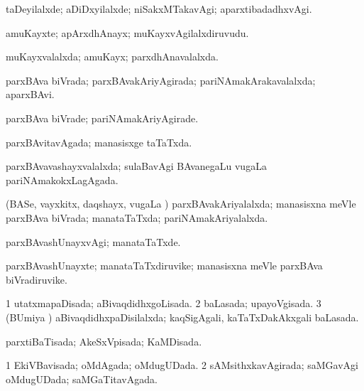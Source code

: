 \bentry
{} 
\gl{\kirxvi}
\expl{}
\bmng
taDeyilalxde; aDiDxyilalxde; niSakxMTakavAgi; aparxtibadadhxvAgi. 
\emng
\eentry

\bentry
{} 
\gl{\nA}
\expl{}
\bmng
amuKayxte; apArxdhAnayx; muKayxvAgilalxdiruvudu. 
\emng
\eentry

\bentry
{} 
\gl{\gu}
\expl{}
\bmng
muKayxvalalxda; amuKayx; parxdhAnavalalxda. 
\emng
\eentry

\bentry
{} 
\gl{\gu}
\expl{}
\bmng
parxBAva biVrada; parxBAvakAriyAgirada; pariNAmakArakavalalxda; aparxBAvi. 
\emng
\eentry

\bentry
{} 
\gl{\kirxvi}
\expl{}
\bmng
parxBAva biVrade; pariNAmakAriyAgirade. 
\emng
\eentry

\bentry
{} 
\gl{\gu}
\expl{}
\bmng
parxBAvitavAgada; manasisxge taTaTxda. 
\emng
\eentry

\bentry
{} 
\gl{\gu}
\expl{}
\bmng
parxBAvavashayxvalalxda; sulaBavAgi BAvanegaLu \mo vugaLa pariNAmakokxLagAgada. 
\emng
\eentry

\bentry
{} 
\gl{\gu}
\expl{}
\bmng
(BASe, vayxkitx, daqshayx, \mo vugaLa \vi) parxBAvakAriyalalxda; manasisxna meVle parxBAva biVrada; manataTaTxda; pariNAmakAriyalalxda. 
\emng
\eentry

\bentry
{} 
\gl{\kirxvi}
\expl{}
\bmng
parxBAvashUnayxvAgi; manataTaTxde. 
\emng
\eentry

\bentry
{} 
\gl{\nA}
\expl{}
\bmng
parxBAvashUnayxte; manataTaTxdiruvike; manasisxna meVle parxBAva biVradiruvike. 
\emng
\eentry

\bentry
{} 
\gl{\gu}
\expl{}
\bmng
\bnum
\num{1} utatxmapaDisada; aBivaqdidhxgoLisada. 
\num{2} baLasada; upayoVgisada. 
\num{3} (BUmiya \vi) aBivaqdidhxpaDisilalxda; kaqSigAgali, kaTaTxDakAkxgali baLasada. 
\enum
\emng
\eentry

\bentry
{} 
\gl{\gu}
\expl{}
\bmng
parxtiBaTisada; AkeSxVpisada; KaMDisada. 
\emng
\eentry

\bentry
{} 
\gl{\gu}
\expl{}
\bmng
\bnum
\num{1} EkiVBavisada; oMdAgada; oMdugUDada. 
\num{2} sAMsithxkavAgirada; saMGavAgi oMdugUDada; saMGaTitavAgada. 
\enum
\emng
\eentry

